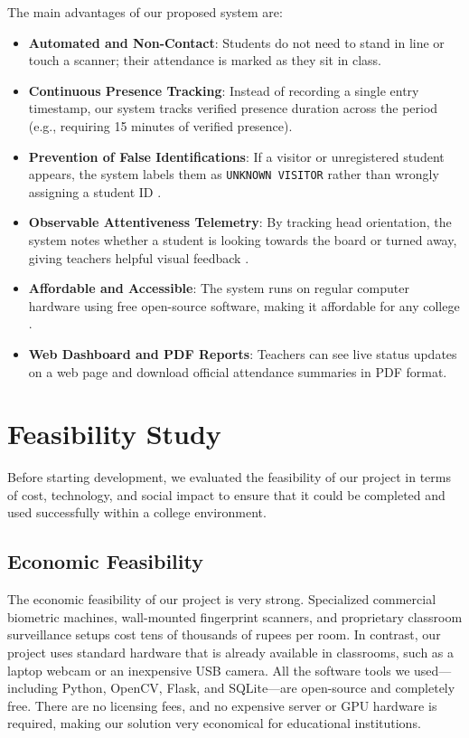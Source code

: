 \documentclass[10pt]{report}
\begin{document}
\hspace{0.5cm}The main advantages of our proposed system are:
\begin{itemize}
    \item \textbf{Automated and Non-Contact}: Students do not need to stand in line or touch a scanner; their attendance is marked as they sit in class.
    \item \textbf{Continuous Presence Tracking}: Instead of recording a single entry timestamp, our system tracks verified presence duration across the period (e.g., requiring 15 minutes of verified presence).
    \item \textbf{Prevention of False Identifications}: If a visitor or unregistered student appears, the system labels them as \texttt{UNKNOWN VISITOR} rather than wrongly assigning a student ID \cite{george2024edgeface}.
    \item \textbf{Observable Attentiveness Telemetry}: By tracking head orientation, the system notes whether a student is looking towards the board or turned away, giving teachers helpful visual feedback \cite{ghodekar2023activeness}.
    \item \textbf{Affordable and Accessible}: The system runs on regular computer hardware using free open-source software, making it affordable for any college \cite{zhang2023realtime}.
    \item \textbf{Web Dashboard and PDF Reports}: Teachers can see live status updates on a web page and download official attendance summaries in PDF format.
\end{itemize}

\section{Feasibility Study}
\hspace{0.5cm}Before starting development, we evaluated the feasibility of our project in terms of cost, technology, and social impact to ensure that it could be completed and used successfully within a college environment.

\subsection{Economic Feasibility}
\hspace{0.5cm}The economic feasibility of our project is very strong. Specialized commercial biometric machines, wall-mounted fingerprint scanners, and proprietary classroom surveillance setups cost tens of thousands of rupees per room. In contrast, our project uses standard hardware that is already available in classrooms, such as a laptop webcam or an inexpensive USB camera. All the software tools we used—including Python, OpenCV, Flask, and SQLite—are open-source and completely free. There are no licensing fees, and no expensive server or GPU hardware is required, making our solution very economical for educational institutions.
\end{document}
